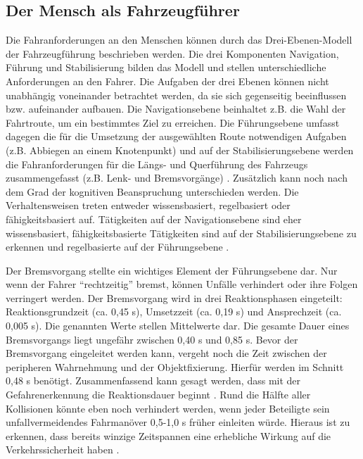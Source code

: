 \subsection{Der Mensch als Fahrzeugführer}\label{Der Mensch als Fahrzzeugführer}
Die Fahranforderungen an den Menschen können durch das Drei-Ebenen-Modell der Fahrzeugführung beschrieben werden. Die drei Komponenten Navigation, Führung und Stabilisierung bilden das Modell und stellen unterschiedliche Anforderungen an den Fahrer. Die Aufgaben der drei Ebenen können nicht unabhängig voneinander betrachtet werden, da sie sich gegenseitig beeinflussen bzw. aufeinander aufbauen. Die Navigationsebene beinhaltet z.B. die Wahl der Fahrtroute, um ein bestimmtes Ziel zu erreichen. Die Führungsebene umfasst dagegen die für die Umsetzung der ausgewählten Route notwendigen Aufgaben (z.B. Abbiegen an einem Knotenpunkt) und auf der Stabilisierungsebene werden die Fahranforderungen für die Längs- und Querführung des Fahrzeugs zusammengefasst (z.B. Lenk- und Bremsvorgänge) \parencite[S. 16]{Gerstenberger.17.02.2015}. Zusätzlich kann noch nach dem Grad der kognitiven Beanspruchung unterschieden werden. Die Verhaltensweisen treten entweder wissensbasiert, regelbasiert oder fähigkeitsbasiert auf. Tätigkeiten auf der Navigationsebene sind eher wissensbasiert, fähigkeitsbasierte Tätigkeiten sind auf der Stabilisierungsebene zu erkennen und regelbasierte auf der Führungsebene \parencite[S. 45]{Grundl.2005}.

Der Bremsvorgang stellte ein wichtiges Element der Führungsebene dar. Nur wenn der Fahrer \enquote{rechtzeitig} bremst, können Unfälle verhindert oder ihre Folgen verringert werden. Der Bremsvorgang wird in drei Reaktionsphasen eingeteilt: Reaktionsgrundzeit (ca. 0,45 s), Umsetzzeit (ca. 0,19 s) und Ansprechzeit (ca. 0,005 s). Die genannten Werte stellen Mittelwerte dar. Die gesamte Dauer eines Bremsvorgangs liegt ungefähr zwischen 0,40 s und 0,85 s. Bevor der Bremsvorgang eingeleitet werden kann, vergeht noch die Zeit zwischen der peripheren Wahrnehmung und der Objektfixierung. Hierfür werden im Schnitt 0,48 s benötigt. Zusammenfassend kann gesagt werden, dass mit der Gefahrenerkennung die Reaktionsdauer beginnt \parencite[S.153]{Burg.2017}. Rund die Hälfte aller Kollisionen könnte eben noch verhindert werden, wenn jeder Beteiligte sein unfallvermeidendes Fahrmanöver 0,5-1,0 s früher einleiten würde. Hieraus ist zu erkennen, dass bereits winzige Zeitspannen eine erhebliche Wirkung auf die Verkehrssicherheit haben \parencite[S. 271]{Burg.2017}.

